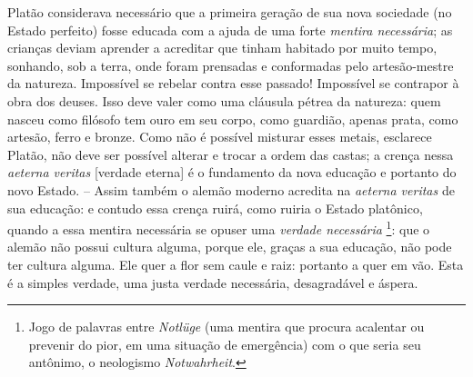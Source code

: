 \begin{enumerate}
\begin{enumerate}
    Platão considerava necessário que a primeira geração de sua nova
    sociedade (no Estado perfeito) fosse educada com a ajuda de uma
    forte \emph{mentira necessária}; as crianças deviam aprender a
    acreditar que tinham habitado por muito tempo, sonhando, sob a
    terra, onde foram prensadas e conformadas pelo artesão-mestre da
    natureza. Impossível se rebelar contra esse passado! Impossível se
    contrapor à obra dos deuses. Isso deve valer como uma cláusula
    pétrea da natureza: quem nasceu como filósofo tem ouro em seu corpo,
    como guardião, apenas prata, como artesão, ferro e bronze. Como não
    é possível misturar esses metais, esclarece Platão, não deve ser
    possível alterar e trocar a ordem das castas; a crença nessa
    \emph{aeterna veritas} {[}verdade eterna{]} é o fundamento da nova
    educação e portanto do novo Estado. -- Assim também o alemão moderno
    acredita na \emph{aeterna veritas} de sua educação: e contudo essa
    crença ruirá, como ruiria o Estado platônico, quando a essa mentira
    necessária se opuser uma \emph{verdade necessária} \footnote{Jogo de
      palavras entre \emph{Notlüge} (uma mentira que procura acalentar
      ou prevenir do pior, em uma situação de emergência) com o que
      seria seu antônimo, o neologismo \emph{Notwahrheit}.}: que o
    alemão não possui cultura alguma, porque ele, graças a sua educação,
    não pode ter cultura alguma. Ele quer a flor sem caule e raiz:
    portanto a quer em vão. Esta é a simples verdade, uma justa verdade
    necessária, desagradável e áspera.


\end{enumerate}
\end{enumerate}
